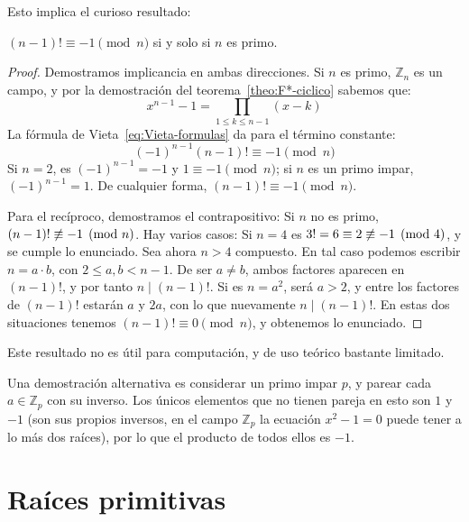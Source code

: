   Esto implica el curioso resultado:
  \begin{theorem}[Wilson]
    \label{theo:Wilson}
    \((n - 1)! \equiv -1 \pmod{n}\) si y solo si \(n\) es primo.
  \end{theorem}
  \begin{proof}
    Demostramos implicancia en ambas direcciones.
    Si \(n\) es primo,
    \(\mathbb{Z}_n\) es un campo,
    y por la demostración del teorema~\ref{theo:F*-ciclico}
    sabemos que:
    \begin{equation*}
      x^{n - 1} - 1
       = \prod_{1 \le k \le n - 1} (x - k)
    \end{equation*}
    La fórmula de Vieta~\eqref{eq:Vieta-formulas}%
    da para el término constante:
    \begin{equation*}
      (-1)^{n - 1} (n - 1)! \equiv -1 \pmod{n}
    \end{equation*}
    Si \(n = 2\),
    es \((-1)^{n - 1} = -1\) y \(1 \equiv -1 \pmod{n}\);
    si \(n\) es un primo impar,
    \((-1)^{n - 1} = 1\).
    De cualquier forma,
    \((n - 1)! \equiv -1 \pmod{n}\).

    Para el recíproco,
    demostramos el contrapositivo:
    Si \(n\) no es primo,
    \((n - 1)! \centernot\equiv -1 \pmod{n}\).
    Hay varios casos:
    Si \(n = 4\)
    es \(3! = 6 \equiv 2 \centernot\equiv -1 \pmod{4}\),
    y se cumple lo enunciado.
    Sea ahora \(n > 4\) compuesto.
    En tal caso podemos escribir \(n = a \cdot b\),
    con \(2 \le a, b < n - 1\).
    De ser \(a \ne b\),
    ambos factores aparecen en \((n - 1)!\),
    y por tanto \(n \mid (n - 1)!\).
    Si es \(n = a^2\),
    será \(a > 2\),
    y entre los factores de \((n - 1)!\)
    estarán \(a\) y \(2 a\),
    con lo que nuevamente \(n \mid (n - 1)!\).
    En estas dos situaciones tenemos \((n - 1)! \equiv 0 \pmod{n}\),
    y obtenemos lo enunciado.
  \end{proof}
  Este resultado no es útil para computación,
  y de uso teórico bastante limitado.

  Una demostración alternativa es considerar un primo impar \(p\),
  y parear cada \(a \in \mathbb{Z}_p\) con su inverso.
  Los únicos elementos
  que no tienen pareja en esto son \(1\) y \(-1\)
  (son sus propios inversos,
   en el campo \(\mathbb{Z}_p\)
   la ecuación \(x^2 - 1 = 0\) puede tener
   a lo más dos raíces),
  por lo que el producto de todos ellos es \(-1\).

\section{Raíces primitivas}
\label{sec:raices-primitivas}

